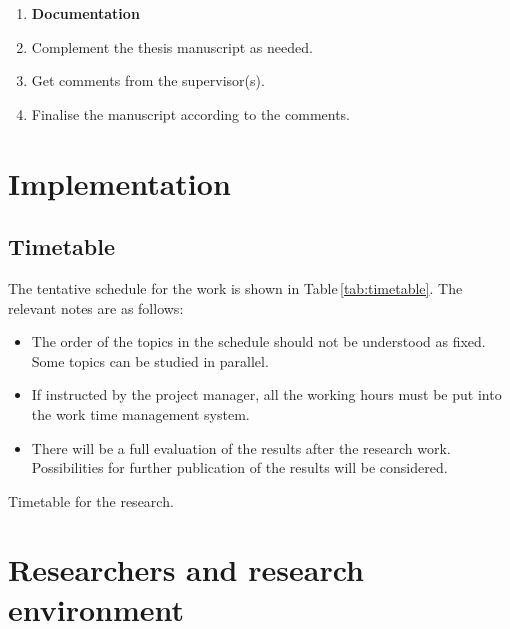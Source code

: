 \documentclass[11pt,a4,notitlepage]{article}
\begin{document}
\begin{enumerate}
\item[] \textbf{Documentation}
%
\item Complement the thesis manuscript as needed.
%
\item Get comments from the supervisor(s).
%
\item Finalise the manuscript according to the comments.
%
%

\end{enumerate}

\section{Implementation}

\subsection{Timetable}

The tentative schedule for the work is shown in Table\,\ref{tab:timetable}.  The
relevant notes are as follows:
%
\begin{itemize}
%
\item The order of the topics in the schedule should not be understood as fixed.
Some topics can be studied in parallel.
%
\item If instructed by the project manager, all the working hours must be put
into the work time management system.
%
\item There will be a full evaluation of the results after the research work.
Possibilities for further publication of the results will be considered.
%
\end{itemize}

\renewcommand{\dtldisplayafterhead}{\hline}
%
%
\begin{table}[h] \centering
%
\caption{Timetable for the research.} \label{tab:timetable}
%
%
\end{table}

\section{Researchers and research environment}
\end{document}
